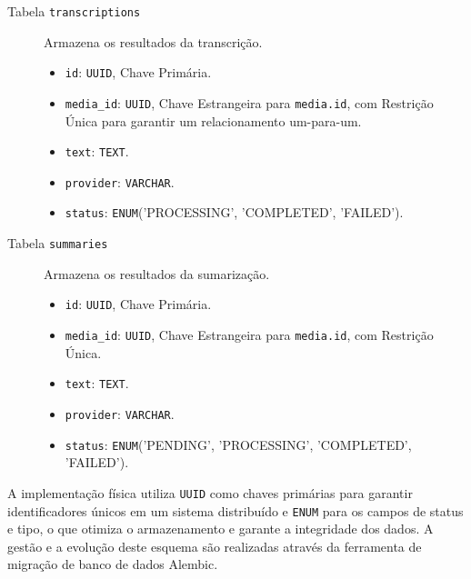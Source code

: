 \begin{description}
    \item[Tabela \texttt{transcriptions}] Armazena os resultados da transcrição.
        \begin{itemize}
            \item \texttt{id}: \texttt{UUID}, Chave Primária.
            \item \texttt{media\_id}: \texttt{UUID}, Chave Estrangeira para \texttt{media.id}, com Restrição Única para garantir um relacionamento um-para-um.
            \item \texttt{text}: \texttt{TEXT}.
            \item \texttt{provider}: \texttt{VARCHAR}.
            \item \texttt{status}: \texttt{ENUM}('PROCESSING', 'COMPLETED', 'FAILED').
        \end{itemize}

    \item[Tabela \texttt{summaries}] Armazena os resultados da sumarização.
        \begin{itemize}
            \item \texttt{id}: \texttt{UUID}, Chave Primária.
            \item \texttt{media\_id}: \texttt{UUID}, Chave Estrangeira para \texttt{media.id}, com Restrição Única.
            \item \texttt{text}: \texttt{TEXT}.
            \item \texttt{provider}: \texttt{VARCHAR}.
            \item \texttt{status}: \texttt{ENUM}('PENDING', 'PROCESSING', 'COMPLETED', 'FAILED').
        \end{itemize}
\end{description}

A implementação física utiliza \texttt{UUID} como chaves primárias para garantir identificadores únicos em um sistema distribuído e \texttt{ENUM} para os campos de status e tipo, o que otimiza o armazenamento e garante a integridade dos dados. A gestão e a evolução deste esquema são realizadas através da ferramenta de migração de banco de dados Alembic.
